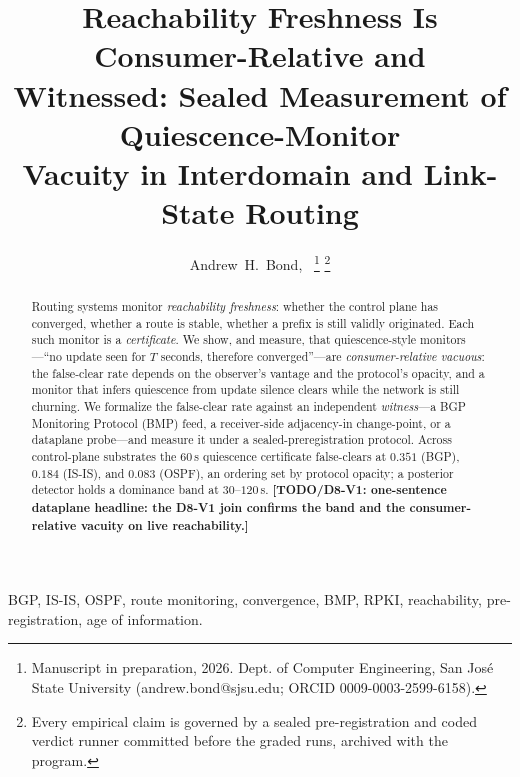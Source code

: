 \documentclass[lettersize,onecolumn]{IEEEtran}
\newcommand{\TODO}[1]{{\color{red}\textbf{[TODO/D8-V1: #1]}}}
\begin{document}
\title{Reachability Freshness Is Consumer-Relative and\\ Witnessed: Sealed Measurement of Quiescence-Monitor\\ Vacuity in Interdomain and Link-State Routing}
\author{Andrew~H.~Bond,~%
\thanks{Manuscript in preparation, 2026. Dept. of Computer Engineering, San Jos\'e
State University (andrew.bond@sjsu.edu; ORCID 0009-0003-2599-6158).}%
\thanks{Every empirical claim is governed by a sealed pre-registration and coded
verdict runner committed before the graded runs, archived with the program.}}
\maketitle

\begin{abstract}
Routing systems monitor \emph{reachability freshness}: whether the control plane
has converged, whether a route is stable, whether a prefix is still validly
originated. Each such monitor is a \emph{certificate}. We show, and measure, that
quiescence-style monitors---``no update seen for $T$ seconds, therefore
converged''---are \emph{consumer-relative vacuous}: the false-clear rate depends
on the observer's vantage and the protocol's opacity, and a monitor that infers
quiescence from update silence clears while the network is still churning. We
formalize the false-clear rate against an independent \emph{witness}---a
BGP Monitoring Protocol (BMP) feed, a receiver-side adjacency-in change-point, or
a dataplane probe---and measure it under a sealed-preregistration protocol.
Across control-plane substrates the $60$\,s quiescence certificate false-clears at
$0.351$ (BGP), $0.184$ (IS-IS), and $0.083$ (OSPF), an ordering set by protocol
opacity; a posterior detector holds a dominance band at $30$--$120$\,s.
\TODO{one-sentence dataplane headline: the D8-V1 join confirms the band and the
consumer-relative vacuity on live reachability.}
\end{abstract}

\begin{IEEEkeywords}
BGP, IS-IS, OSPF, route monitoring, convergence, BMP, RPKI, reachability,
pre-registration, age of information.
\end{IEEEkeywords}
\end{document}
